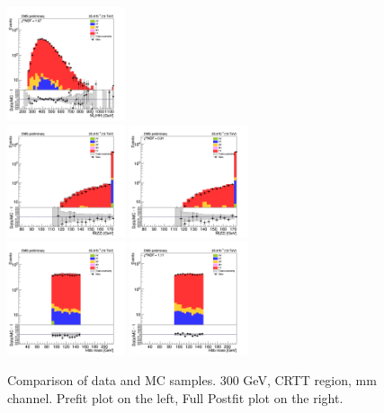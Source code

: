 \begin{figure}[tbp]
\begin{center}
    \includegraphics[width=0.31\textwidth]{figures/mm_300_april18/hhMt_mm_CRTT_FullPostfit_plot_apr18.png}\\
    \includegraphics[width=0.31\textwidth]{figures/mm_300_april18/hmass0_mm_CRTT_prefit_plot_apr18.png}
    \includegraphics[width=0.31\textwidth]{figures/mm_300_april18/hmass0_mm_CRTT_FullPostfit_plot_apr18.png}\\
    \includegraphics[width=0.31\textwidth]{figures/mm_300_april18/hmass1_mm_CRTT_prefit_plot_apr18.png}
    \includegraphics[width=0.31\textwidth]{figures/mm_300_april18/hmass1_mm_CRTT_FullPostfit_plot_apr18.png}\\
    \caption{Comparison of data and MC samples. 300 GeV, CRTT region, mm channel. Prefit plot on the left,           Full Postfit plot on the right.}
    \label{fig:MCcomparisons_mm_low_CRTT}
  \end{center}
\end{figure}

